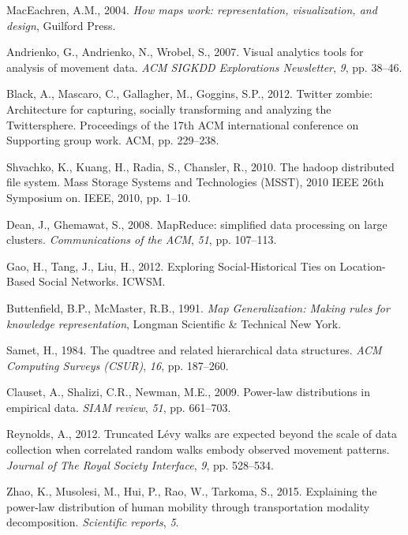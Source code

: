 \documentclass{elsart}
\begin{document}
\begin{thebibliography}{00}
MacEachren, A.M., 2004. {\em How maps work: representation, visualization, and design}, Guilford Press.

Andrienko, G., Andrienko, N., Wrobel, S., 2007. Visual analytics tools for analysis of movement data. {\em ACM SIGKDD Explorations Newsletter}, {\em 9}, pp. 38--46.

Black, A., Mascaro, C., Gallagher, M., Goggins, S.P., 2012. Twitter zombie: Architecture for capturing, socially transforming and analyzing the Twittersphere. Proceedings of the 17th ACM international conference on Supporting group work. ACM, pp. 229--238.

Shvachko, K., Kuang, H., Radia, S., Chansler, R., 2010. The hadoop distributed file system. Mass Storage Systems and Technologies (MSST), 2010 IEEE 26th Symposium on. IEEE, 2010, pp. 1--10.

Dean, J., Ghemawat, S., 2008. MapReduce: simplified data processing on large clusters. {\em Communications of the ACM}, {\em 51}, pp. 107--113.

Gao, H., Tang, J., Liu, H., 2012. Exploring Social-Historical Ties on Location-Based Social Networks. ICWSM.

Buttenfield, B.P., McMaster, R.B., 1991. {\em Map Generalization: Making rules for knowledge representation}, Longman Scientific \& Technical New York.

Samet, H., 1984. The quadtree and related hierarchical data structures. {\em ACM Computing Surveys (CSUR)}, {\em 16}, pp. 187--260.

Clauset, A., Shalizi, C.R., Newman, M.E., 2009. Power-law distributions in empirical data. {\em SIAM review}, {\em 51}, pp. 661--703.

Reynolds, A., 2012. Truncated L{\'e}vy walks are expected beyond the scale of data collection when correlated random walks embody observed movement patterns. {\em Journal of The Royal Society Interface}, {\em
  9}, pp. 528--534.

Zhao, K., Musolesi, M., Hui, P., Rao, W., Tarkoma, S., 2015. Explaining the power-law distribution of human mobility through transportation modality decomposition. {\em Scientific reports}, {\em 5}.



\end{thebibliography}
\end{document}

